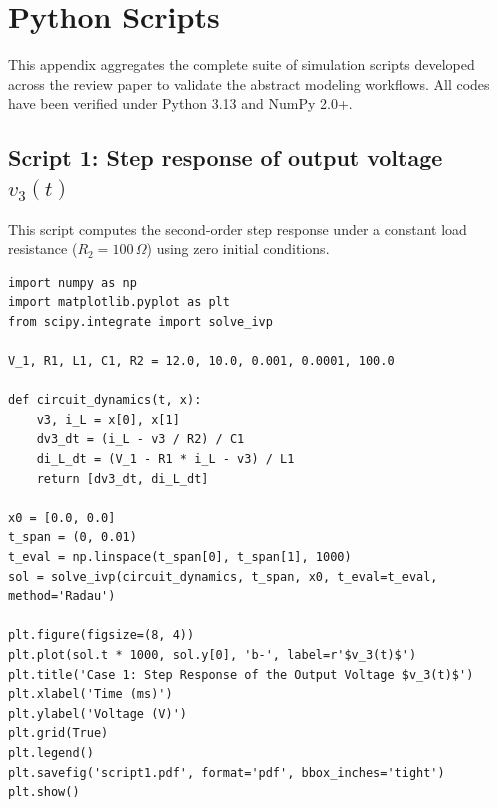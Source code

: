 \documentclass[11pt, a4paper]{article}
\begin{document}


\appendix \setcounter{section}{0}


\section{Python Scripts}

This appendix aggregates the complete suite of simulation scripts developed across the review paper to validate the abstract modeling workflows. All codes have been verified under Python 3.13 and NumPy 2.0+.


\subsection*{Script 1: Step response of output voltage $v_3(t)$}
This script computes the second-order step response under a constant load resistance ($R_2 = 100\,\Omega$) using zero initial conditions.

{\footnotesize

\begin{verbatim}
import numpy as np
import matplotlib.pyplot as plt
from scipy.integrate import solve_ivp

V_1, R1, L1, C1, R2 = 12.0, 10.0, 0.001, 0.0001, 100.0

def circuit_dynamics(t, x):
    v3, i_L = x[0], x[1]
    dv3_dt = (i_L - v3 / R2) / C1
    di_L_dt = (V_1 - R1 * i_L - v3) / L1
    return [dv3_dt, di_L_dt]

x0 = [0.0, 0.0]
t_span = (0, 0.01)
t_eval = np.linspace(t_span[0], t_span[1], 1000)
sol = solve_ivp(circuit_dynamics, t_span, x0, t_eval=t_eval, method='Radau')

plt.figure(figsize=(8, 4))
plt.plot(sol.t * 1000, sol.y[0], 'b-', label=r'$v_3(t)$')
plt.title('Case 1: Step Response of the Output Voltage $v_3(t)$')
plt.xlabel('Time (ms)')
plt.ylabel('Voltage (V)')
plt.grid(True)
plt.legend()
plt.savefig('script1.pdf', format='pdf', bbox_inches='tight')
plt.show()
\end{verbatim}
}
\end{document}
